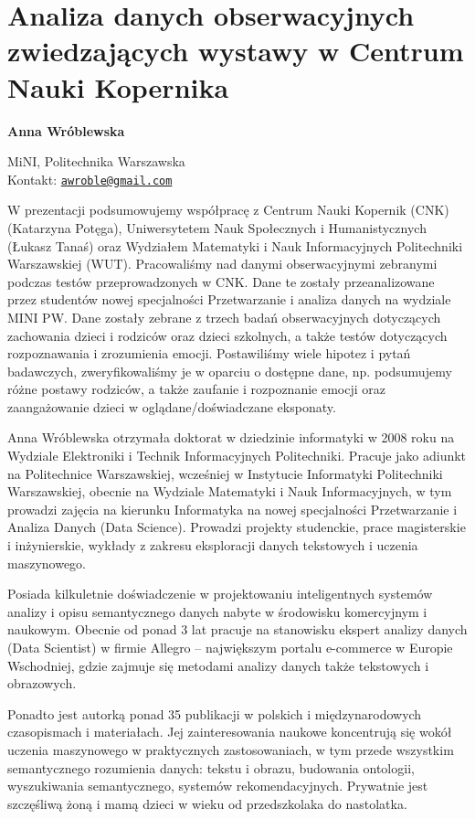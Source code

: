 \documentclass[\main/boa.tex]{subfiles}
\begin{document}
\section{Analiza danych obserwacyjnych zwiedzających wystawy w Centrum Nauki Kopernika}


\begin{minipage}{0.915\textwidth}
	\centering
  {\bf \LARGE {} Anna Wróblewska}
\end{minipage}


\begin{affiliations}
\begin{minipage}{0.915\textwidth}
\centering
\large MiNI, Politechnika Warszawska  \\[1pt]
Kontakt: \href{mailto:awroble@gmail.com}{\nolinkurl{awroble@gmail.com}}\\
\end{minipage}
\end{affiliations}

W prezentacji podsumowujemy współpracę z Centrum Nauki Kopernik (CNK) (Katarzyna Potęga), Uniwersytetem Nauk Społecznych i Humanistycznych (Łukasz Tanaś) oraz Wydziałem Matematyki i Nauk Informacyjnych Politechniki Warszawskiej (WUT). Pracowaliśmy nad danymi obserwacyjnymi zebranymi podczas testów przeprowadzonych w CNK. Dane te zostały przeanalizowane przez studentów nowej specjalności Przetwarzanie i analiza danych na wydziale MINI PW.
Dane zostały zebrane z trzech badań obserwacyjnych dotyczących zachowania dzieci i rodziców oraz dzieci szkolnych, a także testów dotyczących rozpoznawania i zrozumienia emocji.
Postawiliśmy wiele hipotez i pytań badawczych, zweryfikowaliśmy je w oparciu o dostępne dane, np. podsumujemy różne postawy rodziców, a także zaufanie i rozpoznanie emocji oraz zaangażowanie dzieci w oglądane/doświadczane eksponaty. 

\bio
Anna Wróblewska otrzymała doktorat w dziedzinie informatyki w 2008 roku na Wydziale Elektroniki i Technik Informacyjnych Politechniki. Pracuje jako adiunkt na Politechnice Warszawskiej, wcześniej w Instytucie Informatyki Politechniki Warszawskiej, obecnie na Wydziale Matematyki i Nauk Informacyjnych, w tym prowadzi zajęcia na kierunku Informatyka na nowej specjalności Przetwarzanie i Analiza Danych (Data Science). Prowadzi projekty studenckie, prace magisterskie i inżynierskie, wykłady z zakresu eksploracji danych tekstowych i uczenia maszynowego.

Posiada kilkuletnie doświadczenie w projektowaniu inteligentnych systemów analizy i opisu semantycznego danych nabyte w środowisku komercyjnym i naukowym. Obecnie od ponad 3 lat pracuje na stanowisku ekspert analizy danych (Data Scientist) w firmie Allegro – największym portalu e-commerce w Europie Wschodniej, gdzie zajmuje się metodami analizy danych także tekstowych i obrazowych.

Ponadto jest autorką ponad 35 publikacji w polskich i międzynarodowych czasopismach i materiałach. Jej zainteresowania naukowe koncentrują się wokół uczenia maszynowego w praktycznych zastosowaniach, w tym przede wszystkim semantycznego rozumienia danych: tekstu i obrazu, budowania ontologii, wyszukiwania semantycznego, systemów rekomendacyjnych. Prywatnie jest szczęśliwą żoną i mamą dzieci w wieku od przedszkolaka do nastolatka.
\end{document}

